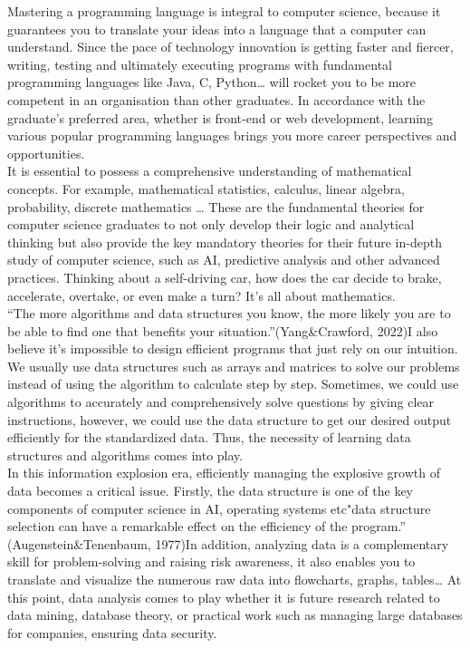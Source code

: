 \documentclass[a4paper, 11pt]{report}
\begin{document}
\noindent Mastering a programming language is integral to computer science, because it guarantees you to translate your ideas into a language that a computer can understand. Since the pace of technology innovation is getting faster and fiercer, writing, testing and ultimately executing programs with fundamental programming languages like Java, C, Python… will rocket you to be more competent in an organisation than other graduates. In accordance with the graduate's preferred area, whether is front-end or web development, learning various popular programming languages brings you more career perspectives and opportunities.\\

\noindent It is essential to possess a comprehensive understanding of mathematical concepts. For example, mathematical statistics, calculus, linear algebra, probability, discrete mathematics … These are the fundamental theories for computer science graduates to not only develop their logic and analytical thinking but also provide the key mandatory theories for their future in-depth study of computer science, such as AI, predictive analysis and other advanced practices. Thinking about a self-driving car, how does the car decide to brake, accelerate, overtake, or even make a turn? It’s all about mathematics.\\

\noindent “The more algorithms and data structures you know, the more likely you are to be able to find one that benefits your situation.”(Yang\&Crawford,  2022)I also believe it’s impossible to design efficient programs that just rely on our intuition. We usually use data structures such as arrays and matrices to solve our problems instead of using the algorithm to calculate step by step. Sometimes, we could use algorithms to accurately and comprehensively solve questions by giving clear instructions, however, we could use the data structure to get our desired output efficiently for the standardized data. Thus, the necessity of learning data structures and algorithms comes into play.\\

\noindent In this information explosion era, efficiently managing the explosive growth of data becomes a critical issue. Firstly, the data structure is one of the key components of computer science in AI, operating systems etc"data structure selection can have a remarkable effect on the efficiency of the program.” (Augenstein\&Tenenbaum, 1977)In addition, analyzing data is a complementary skill for problem-solving and raising risk awareness, it also enables you to translate and visualize the numerous raw data into flowcharts, graphs, tables… At this point, data analysis comes to play whether it is future research related to data mining, database theory, or practical work such as managing large databases for companies, ensuring data security.\\
\end{document}
